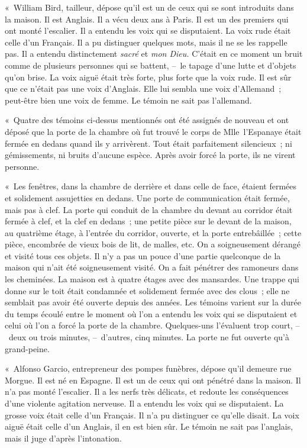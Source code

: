 \documentclass[french,twoside]{book} %
\begin{document}
« William Bird, tailleur, dépose qu’il est un de ceux qui se sont introduits dans la maison. Il est Anglais. Il a vécu deux ans à Paris. Il est un des premiers qui ont monté l’escalier. Il a entendu les voix qui se disputaient. La voix rude était celle d’un Français. Il a pu distinguer quelques mots, mais il ne se les rappelle pas. Il a entendu distinctement \emph{sacré} et \emph{mon Dieu.} C’était en ce moment un bruit comme de plusieurs personnes qui se battent, – le tapage d’une lutte et d’objets qu’on brise. La voix aiguë était très forte, plus forte que la voix rude. Il est sûr que ce n’était pas une voix d’Anglais. Elle lui sembla une voix d’Allemand ; peut-être bien une voix de femme. Le témoin ne sait pas l’allemand.\par
« Quatre des témoins ci-dessus mentionnés ont été assignés de nouveau et ont déposé que la porte de la chambre où fut trouvé le corps de Mlle l’Espanaye était fermée en dedans quand ils y arrivèrent. Tout était parfaitement silencieux ; ni gémissements, ni bruits d’aucune espèce. Après avoir forcé la porte, ils ne virent personne.\par
« Les fenêtres, dans la chambre de derrière et dans celle de face, étaient fermées et solidement assujetties en dedans. Une porte de communication était fermée, mais pas à clef. La porte qui conduit de la chambre du devant au corridor était fermée à clef, et la clef en dedans ; une petite pièce sur le devant de la maison, au quatrième étage, à l’entrée du corridor, ouverte, et la porte entrebâillée ; cette pièce, encombrée de vieux bois de lit, de malles, etc. On a soigneusement dérangé et visité tous ces objets. Il n’y a pas un pouce d’une partie quelconque de la maison qui n’ait été soigneusement visité. On a fait pénétrer des ramoneurs dans les cheminées. La maison est à quatre étages avec des mansardes. Une trappe qui donne sur le toit était condamnée et solidement fermée avec des clous ; elle ne semblait pas avoir été ouverte depuis des années. Les témoins varient sur la durée du temps écoulé entre le moment où l’on a entendu les voix qui se disputaient et celui où l’on a forcé la porte de la chambre. Quelques-uns l’évaluent trop court, – deux ou trois minutes, – d’autres, cinq minutes. La porte ne fut ouverte qu’à grand-peine.\par
« Alfonso Garcio, entrepreneur des pompes funèbres, dépose qu’il demeure rue Morgue. Il est né en Espagne. Il est un de ceux qui ont pénétré dans la maison. Il n’a pas monté l’escalier. Il a les nerfs très délicats, et redoute les conséquences d’une violente agitation nerveuse. Il a entendu les voix qui se disputaient. La grosse voix était celle d’un Français. Il n’a pu distinguer ce qu’elle disait. La voix aiguë était celle d’un Anglais, il en est bien sûr. Le témoin ne sait pas l’anglais, mais il juge d’après l’intonation.\par
\end{document}
